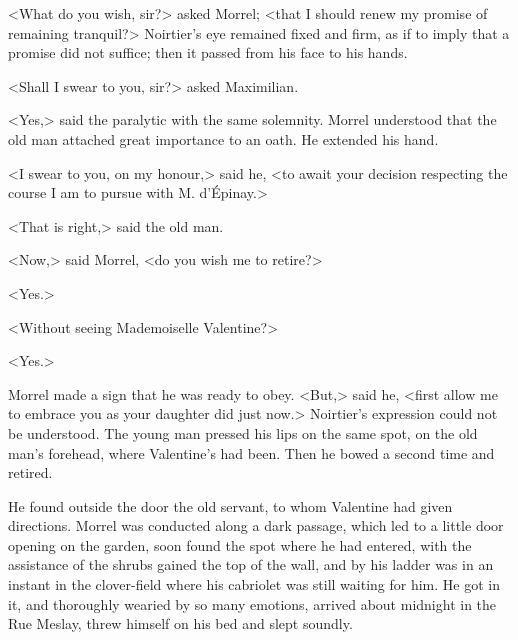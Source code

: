  <What do you wish, sir?> asked Morrel; <that I should renew my promise of remaining tranquil?> Noirtier's eye remained fixed and firm, as if to imply that a promise did not suffice; then it passed from his face to his hands. 

 <Shall I swear to you, sir?> asked Maximilian. 

 <Yes,> said the paralytic with the same solemnity. Morrel understood that the old man attached great importance to an oath. He extended his hand. 

 <I swear to you, on my honour,> said he, <to await your decision respecting the course I am to pursue with M. d'Épinay.> 

 <That is right,> said the old man. 

 <Now,> said Morrel, <do you wish me to retire?> 

 <Yes.> 

 <Without seeing Mademoiselle Valentine?> 

 <Yes.> 

 Morrel made a sign that he was ready to obey. <But,> said he, <first allow me to embrace you as your daughter did just now.> Noirtier's expression could not be understood. The young man pressed his lips on the same spot, on the old man's forehead, where Valentine's had been. Then he bowed a second time and retired. 

 He found outside the door the old servant, to whom Valentine had given directions. Morrel was conducted along a dark passage, which led to a little door opening on the garden, soon found the spot where he had entered, with the assistance of the shrubs gained the top of the wall, and by his ladder was in an instant in the clover-field where his cabriolet was still waiting for him. He got in it, and thoroughly wearied by so many emotions, arrived about midnight in the Rue Meslay, threw himself on his bed and slept soundly. 